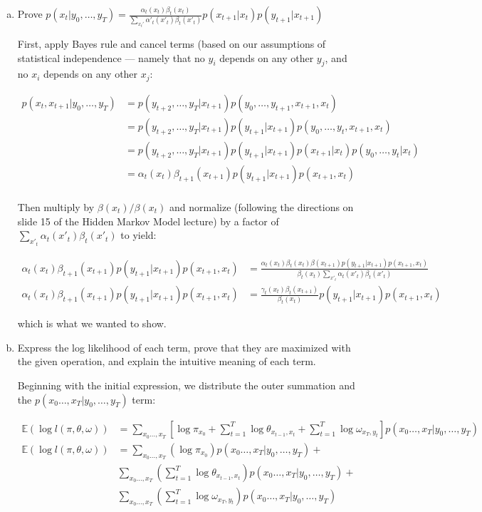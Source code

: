 \documentclass{article}
\begin{document}
\begin{enumerate}[(a)]
\item Prove $p(x_t|y_0,\dots,y_T) = \frac {\alpha_t(x_t)\beta_t(x_t)}
  {\sum_{x_t'}\alpha'_t(x'_t)\beta_t(x'_t)}p(x_{t+1}|x_t)p(y_{t+1} | x_{t+1})$

First, apply Bayes rule and cancel terms (based on our assumptions of
statistical independence --- namely that no $y_i$ depends on any other
$y_j$, and no $x_i$ depends on any other $x_j$:

\begin{align*}
p(x_t, x_{t+1} | y_0,\dots,y_T) &= p(y_{t+2},\dots,y_T | x_{t+1})p(y_0, \dots, y_{t+1}, x_{t+1}, x_t)\\
&= p(y_{t+2},\dots,y_T | x_{t+1})p(y_{t+1} | x_{t+1}) p(y_0, \dots, y_t, x_{t+1}, x_t)\\
&= p(y_{t+2},\dots,y_T | x_{t+1})p(y_{t+1} | x_{t+1}) p(x_{t+1} | x_t) p(y_0, \dots, y_{t} | x_t)\\
&= \alpha_t(x_t) \beta_{t+1}(x_{t+1}) p(y_{t+1} | x_{t+1}) p (x_{t+1}, x_t)\\
\end{align*}

Then multiply by $\beta(x_t) / \beta(x_t)$ and normalize (following the
directions on slide 15 of the Hidden Markov Model lecture) by a factor
of $\sum \limits_{x'_t} \alpha_t(x'_t)\beta_t(x'_t)$ to yield:

\begin{align*}
  \alpha_t(x_t) \beta_{t+1}(x_{t+1}) p(y_{t+1} | x_{t+1}) p(x_{t+1}, x_t) &= \frac {\alpha_t(x_t) \beta_t(x_t) \beta(x_{t+1}) p(y_{t+1} | x_{t+1}) p (x_{t+1}, x_t)} {\beta_t(x_t) \sum \limits_{x'_t} \alpha_t(x'_t)\beta_t(x'_t)}\\
  \alpha_t(x_t) \beta_{t+1}(x_{t+1}) p(y_{t+1} | x_{t+1}) p(x_{t+1}, x_t) &= \frac {\gamma_t(x_t) \beta_t(x_{t +1})} {\beta_t(x_t)} p(y_{t+1} | x_{t+1}) p(x_{t+1}, x_t)
\end{align*}

which is what we wanted to show.


\item Express the log likelihood of each term, prove that they are
  maximized with the given operation, and explain the intuitive
  meaning of each term.


Beginning with the initial expression, we distribute the outer
summation and the $p(x_0\dots,x_T | y_0,\dots,y_T)$ term:

\begin{align*}
\mathbb{E}(\log l(\pi, \theta, \omega)) &= \sum \limits_{x_0\dots,x_T}\left[\log\pi_{x_0} + \sum_{t=1}^T \log\theta_{x_{t-1}, x_t} + \sum_{t=1}^T\log\omega_{x_T,y_t}\right]p(x_0\dots,x_T | y_0,\dots,y_T)&\\
\mathbb{E}(\log l(\pi, \theta, \omega)) &= \sum \limits_{x_0\dots,x_T} (\log\pi_{x_0})p(x_0\dots,x_T | y_0,\dots,y_T) +&\\
&\sum \limits_{x_0\dots,x_T}  (\sum_{t=1}^T \log\theta_{x_{t-1}, x_t})p(x_0\dots,x_T | y_0,\dots,y_T) + &\\
&\sum \limits_{x_0\dots,x_T} (\sum_{t=1}^T\log\omega_{x_T,y_t})p(x_0\dots,x_T | y_0,\dots,y_T)&\\
\end{align*}


\end{enumerate}
\end{document}
